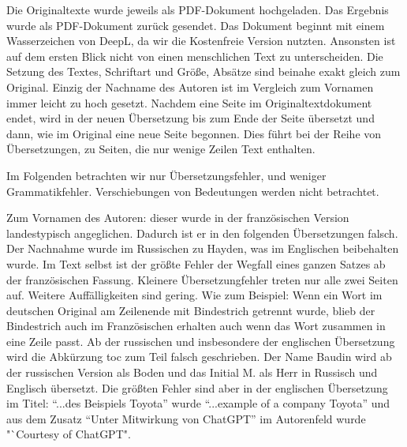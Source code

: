 Die Originaltexte wurde jeweils als PDF-Dokument hochgeladen. Das Ergebnis wurde als PDF-Dokument zurück gesendet. Das Dokument beginnt mit einem Wasserzeichen von DeepL, da wir die Kostenfreie Version nutzten.
Ansonsten ist auf dem ersten Blick nicht von einen menschlichen Text zu unterscheiden. Die Setzung des Textes, Schriftart und Größe, Absätze sind beinahe exakt gleich zum Original.
Einzig der Nachname des Autoren ist im Vergleich zum Vornamen immer leicht zu hoch gesetzt. Nachdem eine Seite im Originaltextdokument endet, wird in der neuen Übersetzung bis zum Ende der Seite übersetzt und dann, wie im Original eine neue Seite begonnen. Dies führt bei der Reihe von Übersetzungen, zu Seiten, die nur wenige Zeilen Text enthalten.

Im Folgenden betrachten wir nur Übersetzungsfehler, und weniger Grammatikfehler. Verschiebungen von Bedeutungen werden nicht betrachtet. 

Zum Vornamen des Autoren: dieser wurde in der französischen Version landestypisch angeglichen. Dadurch ist er in den folgenden Übersetzungen falsch. Der Nachnahme wurde im Russischen zu Hayden, was im Englischen beibehalten wurde.
Im Text selbst ist der größte Fehler der Wegfall eines ganzen Satzes ab der französischen Fassung. Kleinere Übersetzungfehler treten nur alle zwei Seiten auf. Weitere Auffälligkeiten sind gering. Wie zum Beispiel: Wenn ein Wort im deutschen Original am Zeilenende mit Bindestrich getrennt wurde, blieb der Bindestrich auch im Französischen erhalten auch wenn das Wort zusammen in eine Zeile passt.
Ab der russischen und insbesondere der englischen Übersetzung wird die Abkürzung \gls{toc} zum Teil falsch geschrieben. Der Name Baudin wird ab der russischen Version als Boden und das Initial M. als Herr in Russisch und Englisch übersetzt. Die größten Fehler sind aber in der englischen Übersetzung im Titel: "`...des Beispiels Toyota"' wurde "`...example of a company Toyota"' und aus dem Zusatz "`Unter Mitwirkung von ChatGPT"' im Autorenfeld wurde "`Courtesy of ChatGPT".